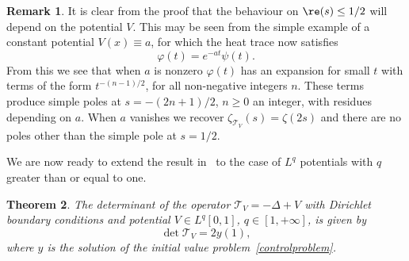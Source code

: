 \documentclass[JEP,XML,SOM,Unicode,NoEqCountersInSection,NoFloatCountersInSection]{cedram}
\theoremstyle{plain}
\newtheorem{theorem}{Theorem}
\theoremstyle{definition}
\newtheorem{remark}[theorem]{Remark}
\newcommand{\ttt}{\mathscr{T}}
\let\balpha q
\begin{document}
\begin{remark}
It is clear from the proof that the behaviour on $\re(s)\leq 1/2$ will depend on the potential $V$. This may be seen from the simple example of a constant
potential $V(x) \equiv a$, for which the heat trace now satisfies
\[
\varphi(t) = e^{-a t}\psi(t).
\]
From this we see that when $a$ is nonzero $\varphi(t)$ has an expansion for small $t$ with terms of the form $t^{-(n-1)/2}$, for all non-negative
integers $n$. These terms produce simple poles at $s=-(2n+1)/2$, $n\geq 0$ an integer, with residues depending on $a$. When $a$ vanishes
we recover $\zeta_{\ttt_V}(s) = \zeta(2s)$ and there are no poles other than the simple pole at $s=1/2$.
\end{remark}

We are now ready to extend the result in~\cite{Levit-Smilansky} to the case of
$L^{\balpha}$ potentials with $\balpha$ greater than or equal to one.
\begin{theorem} \label{thm0}
The determinant of the operator $\ttt_V =-\Delta + V$ with Dirichlet boundary
conditions and potential $V\in L^\balpha[0,1]$, $\balpha \in[1,+\infty]$,
is given by
\begin{equation}\label{eq:dety1}
\det\ttt_V = 2y(1),
\end{equation}
where $y$ is the solution of the initial value problem~\eqref{controlproblem}.
\end{theorem}
\end{document}

